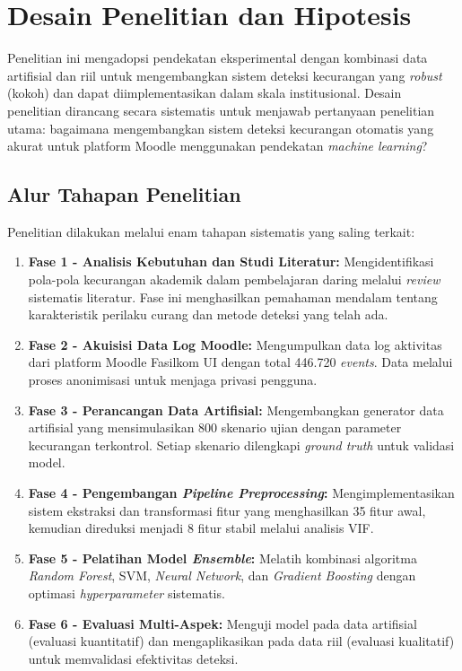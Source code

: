 \section{Desain Penelitian dan Hipotesis}
\label{sec:desainPenelitian}
Penelitian ini mengadopsi pendekatan eksperimental dengan kombinasi data artifisial dan riil untuk mengembangkan sistem deteksi kecurangan yang \textit{robust} (kokoh) dan dapat diimplementasikan dalam skala institusional. Desain penelitian dirancang secara sistematis untuk menjawab pertanyaan penelitian utama: bagaimana mengembangkan sistem deteksi kecurangan otomatis yang akurat untuk platform Moodle menggunakan pendekatan \textit{machine learning}?

\subsection{Alur Tahapan Penelitian}
\label{subsec:alurTahapanPenelitian}
Penelitian dilakukan melalui enam tahapan sistematis yang saling terkait:

\begin{enumerate}
    \item \textbf{Fase 1 - Analisis Kebutuhan dan Studi Literatur:} Mengidentifikasi pola-pola kecurangan akademik dalam pembelajaran daring melalui \textit{review} sistematis literatur. Fase ini menghasilkan pemahaman mendalam tentang karakteristik perilaku curang dan metode deteksi yang telah ada.
    
    \item \textbf{Fase 2 - Akuisisi Data Log Moodle:} Mengumpulkan data log aktivitas dari platform Moodle Fasilkom UI dengan total 446.720 \textit{events}. Data melalui proses anonimisasi untuk menjaga privasi pengguna.
    
    \item \textbf{Fase 3 - Perancangan Data Artifisial:} Mengembangkan generator data artifisial yang mensimulasikan 800 skenario ujian dengan parameter kecurangan terkontrol. Setiap skenario dilengkapi \textit{ground truth} untuk validasi model.
    
    \item \textbf{Fase 4 - Pengembangan \textit{Pipeline Preprocessing}:} Mengimplementasikan sistem ekstraksi dan transformasi fitur yang menghasilkan 35 fitur awal, kemudian direduksi menjadi 8 fitur stabil melalui analisis VIF.
    
    \item \textbf{Fase 5 - Pelatihan Model \textit{Ensemble}:} Melatih kombinasi algoritma \textit{Random Forest}, SVM, \textit{Neural Network}, dan \textit{Gradient Boosting} dengan optimasi \textit{hyperparameter} sistematis.
    
    \item \textbf{Fase 6 - Evaluasi Multi-Aspek:} Menguji model pada data artifisial (evaluasi kuantitatif) dan mengaplikasikan pada data riil (evaluasi kualitatif) untuk memvalidasi efektivitas deteksi.
\end{enumerate}


